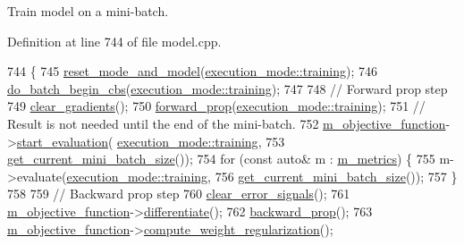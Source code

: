 Train model on a mini-\/batch. 

Definition at line 744 of file model.\+cpp.


\begin{DoxyCode}
744                              \{
745   \hyperlink{classlbann_1_1model_a5d188d75f53e0a4c6161500181b27c03}{reset\_mode\_and\_model}(\hyperlink{base_8hpp_a2781a159088df64ed7d47cc91c4dc0a8ac185ddac8b5a8f5aa23c5b80bc12d214}{execution\_mode::training});
746   \hyperlink{classlbann_1_1model_a156acfa740b92322d44b6c477636eb26}{do\_batch\_begin\_cbs}(\hyperlink{base_8hpp_a2781a159088df64ed7d47cc91c4dc0a8ac185ddac8b5a8f5aa23c5b80bc12d214}{execution\_mode::training});
747 
748   \textcolor{comment}{// Forward prop step}
749   \hyperlink{classlbann_1_1model_ae4ca41f514498a37503ecc6ba1600bab}{clear\_gradients}();
750   \hyperlink{classlbann_1_1model_adc4f845c8e292afe2d8686f459729484}{forward\_prop}(\hyperlink{base_8hpp_a2781a159088df64ed7d47cc91c4dc0a8ac185ddac8b5a8f5aa23c5b80bc12d214}{execution\_mode::training});
751   \textcolor{comment}{// Result is not needed until the end of the mini-batch.}
752   \hyperlink{classlbann_1_1model_a24c50e7108dd7698671aed7df5b22e8b}{m\_objective\_function}->\hyperlink{classlbann_1_1objective__function_a3edb6708894d31ec2a014c6eb8a61df2}{start\_evaluation}(
      \hyperlink{base_8hpp_a2781a159088df64ed7d47cc91c4dc0a8ac185ddac8b5a8f5aa23c5b80bc12d214}{execution\_mode::training},
753                                          \hyperlink{classlbann_1_1model_a3eaad8fd538b99ecab9afca6dc3327fd}{get\_current\_mini\_batch\_size}());
754   \textcolor{keywordflow}{for} (\textcolor{keyword}{const} \textcolor{keyword}{auto}& m : \hyperlink{classlbann_1_1model_ae75c9aafe9e5a93980cc1bbae986bc79}{m\_metrics}) \{
755     m->evaluate(\hyperlink{base_8hpp_a2781a159088df64ed7d47cc91c4dc0a8ac185ddac8b5a8f5aa23c5b80bc12d214}{execution\_mode::training},
756                 \hyperlink{classlbann_1_1model_a3eaad8fd538b99ecab9afca6dc3327fd}{get\_current\_mini\_batch\_size}());
757   \}
758 
759   \textcolor{comment}{// Backward prop step}
760   \hyperlink{classlbann_1_1model_a43b3ed176749e0aab6065f274ec2a717}{clear\_error\_signals}();
761   \hyperlink{classlbann_1_1model_a24c50e7108dd7698671aed7df5b22e8b}{m\_objective\_function}->\hyperlink{classlbann_1_1objective__function_ae8b7314bdc12ba52d270b46a35acd138}{differentiate}();
762   \hyperlink{classlbann_1_1model_a2ce4444efaab4dd1236c837d6847e438}{backward\_prop}();
763   \hyperlink{classlbann_1_1model_a24c50e7108dd7698671aed7df5b22e8b}{m\_objective\_function}->\hyperlink{classlbann_1_1objective__function_a7b7f8869bf110846e971fef995db51e1}{compute\_weight\_regularization}();

\end{DoxyCode}
